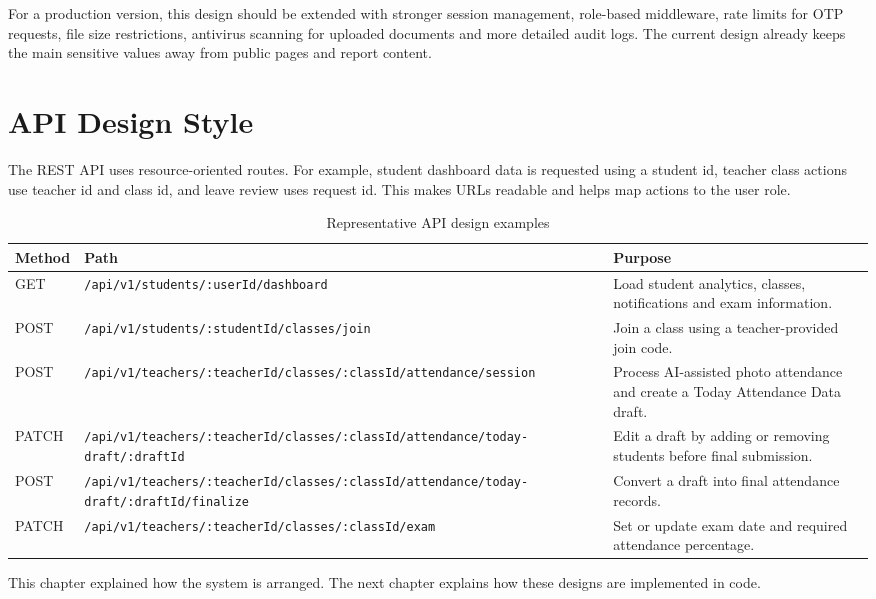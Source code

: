 For a production version, this design should be extended with stronger session management, role-based middleware, rate limits for OTP requests, file size restrictions, antivirus scanning for uploaded documents and more detailed audit logs. The current design already keeps the main sensitive values away from public pages and report content.

\section{API Design Style}

The REST API uses resource-oriented routes. For example, student dashboard data is requested using a student id, teacher class actions use teacher id and class id, and leave review uses request id. This makes URLs readable and helps map actions to the user role.

\begin{table}[H]
\centering
\caption{Representative API design examples}
\label{tab:api-design-examples}
\begin{tabularx}{\textwidth}{p{2.3cm} p{5.4cm} X}
\toprule
\textbf{Method} & \textbf{Path} & \textbf{Purpose}\\
\midrule
GET & \texttt{/api/v1/students/:userId/dashboard} & Load student analytics, classes, notifications and exam information.\\
POST & \texttt{/api/v1/students/:studentId/classes/join} & Join a class using a teacher-provided join code.\\
POST & \texttt{/api/v1/teachers/:teacherId/classes/:classId/attendance/session} & Process AI-assisted photo attendance and create a Today Attendance Data draft.\\
PATCH & \texttt{/api/v1/teachers/:teacherId/classes/:classId/attendance/today-draft/:draftId} & Edit a draft by adding or removing students before final submission.\\
POST & \texttt{/api/v1/teachers/:teacherId/classes/:classId/attendance/today-draft/:draftId/finalize} & Convert a draft into final attendance records.\\
PATCH & \texttt{/api/v1/teachers/:teacherId/classes/:classId/exam} & Set or update exam date and required attendance percentage.\\
\bottomrule
\end{tabularx}
\end{table}

This chapter explained how the system is arranged. The next chapter explains how these designs are implemented in code.
